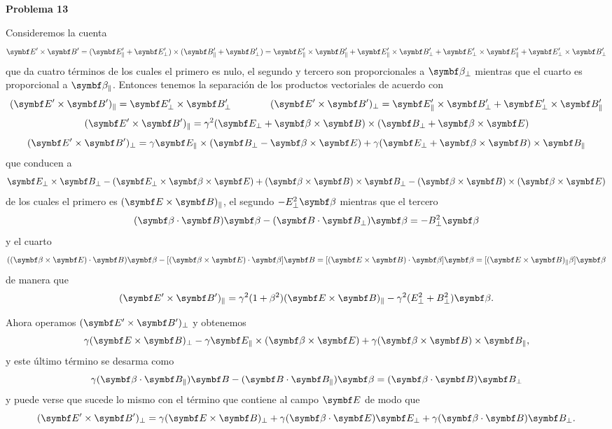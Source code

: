 \documentclass[10pt,oneside]{CBFT_book}
\begin{document}
\begin{ejemplo}{\bf Problema 13}

Consideremos la cuenta
\[
	\pv{E'}{B'} = ( \vb{E}_\parallel' + \vb{E}_\perp' )\times( \vb{B}_\parallel' + \vb{B}_\perp' ) =
	\vb{E}_\parallel' \times \vb{B}_\parallel' +
	\vb{E}_\parallel' \times \vb{B}_\perp' +
	\vb{E}_\perp' \times \vb{E}_\parallel' +
	\vb{E}_\perp' \times \vb{B}_\perp' 
\]
que da cuatro términos de los cuales el primero es nulo, el segundo y tercero son proporcionales a
$\vb{\beta}_\perp$ mientras que el cuarto es proporcional a $\vb{\beta}_\parallel$.
Entonces tenemos la separación de los productos vectoriales de acuerdo con
\[
	( \pv{E'}{B'} )_\parallel = \pv{E'_\perp}{B'_\perp}
	\qquad \qquad 
	( \pv{E'}{B'} )_\perp = \pv{E'_\parallel}{B'_\perp} + \pv{E'_\perp}{B'_\parallel} 
\]
\[
	( \pv{E'}{B'} )_\parallel = \gamma^2 ( \vb{E}_\perp + \pv{\beta}{B} ) \times ( \vb{B}_\perp + \pv{\beta}{E} )
\]
\[
	( \pv{E'}{B'} )_\perp = \gamma \vb{E_\parallel} \times ( \vb{B}_\perp - \pv{\beta}{E} )
	+ \gamma ( \vb{E}_\perp + \pv{\beta}{B} ) \times \vb{B_\parallel} 
\]
que conducen a
\[
	\pv{E_\perp}{B_\perp} - ( \vb{E}_\perp \times \pv{\beta}{E} ) + ( \pv{\beta}{B} ) \times \vb{B_\perp}  - 
	( \pv{\beta}{B} ) \times ( \pv{\beta}{E} ) 
\]
de los cuales el primero es $(\pv{E}{B})_\parallel$, el segundo $-E^2_\perp \vb{\beta}$ mientras que
el tercero
\[
	(\pe{\beta}{B})\vb{\beta} - (\pe{B}{B_\perp})\vb{\beta} = - B^2_\perp \vb{\beta}
\]
y el cuarto
\[
	( (\pv{\beta}{E})\cdot \vb{B} ) \vb{\beta} - [ (\pv{\beta}{E})\cdot \vb{\beta} ]\vb{B} =
	[ (\pv{E}{B})\cdot \vb{\beta} ]\vb{\beta} = [ (\pv{E}{B})_\parallel \beta] \vb{\beta}
\]
de manera que 
\[
	(\pv{E'}{B'})_\parallel = \gamma^2 ( 1 + \beta^2 ) (\pv{E}{B})_\parallel -
	\gamma^2 ( E^2_\perp + B^2_\perp ) \vb{\beta}.
\]

Ahora operamos $ (\pv{E'}{B'})_\perp $ y obtenemos
\[
	\gamma (\pv{E}{B})_\perp - \gamma \vb{E}_\parallel \times (\pv{\beta}{E}) +
	\gamma ( \pv{\beta}{B}) \times \vb{B}_\parallel,
\]
y este último término se desarma como
\[
	\gamma (\pe{\beta}{B_\parallel})\vb{B} - (\pe{B}{B_\parallel})\vb{\beta} =
	(\pe{\beta}{B})\vb{B}_\perp
\]
y puede verse que sucede lo mismo con el término que contiene al campo $\vb{E}$ de modo que
\[
	(\pv{E'}{B'})_\perp = \gamma (\pv{E}{B})_\perp + \gamma (\pe{\beta}{E}) \vb{E}_\perp 
	+ \gamma (\pe{\beta}{B}) \vb{B}_\perp .
\]


\end{ejemplo}
\end{document}
